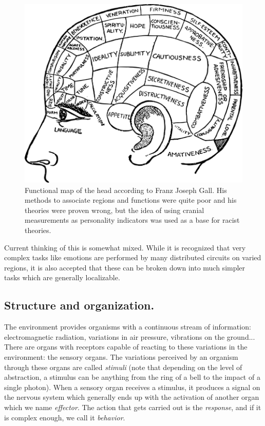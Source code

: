 \begin{figure}[H]
	\centering

	\includegraphics[width=\linewidth]{media/4-gall.png}
	\caption{Functional map of the head according to Franz Joseph Gall. His methods to associate regions and functions were quite poor and his theories were proven wrong, but the idea of using cranial measurements as personality indicators was used as a base for racist theories.}
	\label{gall}
\end{figure}

Current thinking of this is somewhat mixed. While it is recognized that very complex tasks like emotions are performed by many distributed circuits on varied regions, it is also accepted that these can be broken down into much simpler tasks which are generally localizable.

\subsection{Structure and organization.}

The environment provides organisms with a continuous stream of information: electromagnetic radiation, variations in air pressure, vibrations on the ground... There are organs with receptors capable of reacting to these variations in the environment: the sensory organs. The variations perceived by an organism through these organs are called \textit{stimuli} (note that depending on the level of abstraction, a stimulus can be anything from the ring of a bell to the impact of a single photon). When a sensory organ receives a stimulus, it produces a signal on the nervous system which generally ends up with the activation of another organ which we name \textit{effector}. The action that gets carried out is the \textit{response}, and if it is complex enough, we call it \textit{behavior}.

